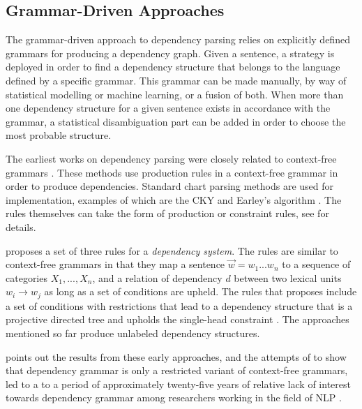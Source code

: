 \subsection{Grammar-Driven Approaches}
\label{grammar-driven}

The grammar-driven approach to dependency parsing relies on explicitly defined grammars for producing a dependency graph. Given a sentence, a strategy is deployed in order to find a dependency structure that belongs to the language defined by a specific grammar. This grammar can be made manually, by way of statistical modelling or machine learning, or a fusion of both. When more than one dependency structure for a given sentence exists in accordance with the grammar, a statistical disambiguation part can be added in order to choose the most probable structure.


The earliest works on dependency parsing were closely related to context-free grammars \cite{KublerEtAl:09}. These methods use production rules in a context-free grammar in order to produce dependencies. Standard chart parsing methods are used for implementation, examples of which are the CKY \cite{Younger:67} and Earley's algorithm \cite{Early:70}. The rules themselves can take the form of production or constraint rules, see  for details.

\citeauthor{Gaifman:65} proposes a set of three rules for a \textit{dependency system}. The rules are similar to context-free grammars in that they map a sentence $\vec{w} = w_1 ... w_n$ to a sequence of categories $X_1, ..., X_n$, and a relation of dependency $d$ between two lexical units $w_i \rightarrow w_j$ as long as a set of conditions are upheld. The rules that \citeauthor{Gaifman:65} proposes include a set of conditions with restrictions that lead to a dependency structure that is a projective directed tree and upholds the single-head constraint \cite{Gaifman:65}. The approaches mentioned so far produce unlabeled dependency structures.

\citeauthor{Niv:05} points out the results from these early approaches, and the attempts of \citeauthor{Gaifman:65} to show that dependency grammar is only a restricted variant of context-free grammars, led to a to a period of approximately twenty-five years of relative lack of interest towards dependency grammar among researchers working in the field of NLP \cite{Niv:05}. 

